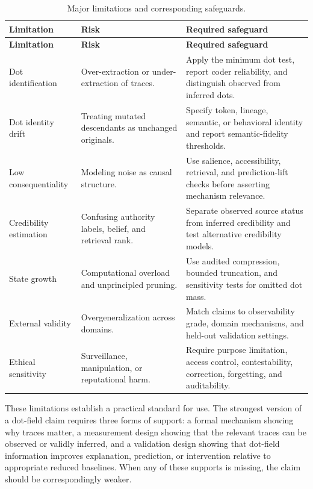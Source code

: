\documentclass[11pt]{article}
\theoremstyle{remark}
\begin{document}
\begin{longtable}{L{0.20\textwidth}L{0.31\textwidth}L{0.37\textwidth}}
\caption{Major limitations and corresponding safeguards.}\label{tab:limitations-safeguards}\\
\toprule
\textbf{Limitation} & \textbf{Risk} & \textbf{Required safeguard}\\
\midrule
\endfirsthead
\toprule
\textbf{Limitation} & \textbf{Risk} & \textbf{Required safeguard}\\
\midrule
\endhead
Dot identification & Over-extraction or under-extraction of traces. & Apply the minimum dot test, report coder reliability, and distinguish observed from inferred dots.\\
Dot identity drift & Treating mutated descendants as unchanged originals. & Specify token, lineage, semantic, or behavioral identity and report semantic-fidelity thresholds.\\
Low consequentiality & Modeling noise as causal structure. & Use salience, accessibility, retrieval, and prediction-lift checks before asserting mechanism relevance.\\
Credibility estimation & Confusing authority labels, belief, and retrieval rank. & Separate observed source status from inferred credibility and test alternative credibility models.\\
State growth & Computational overload and unprincipled pruning. & Use audited compression, bounded truncation, and sensitivity tests for omitted dot mass.\\
External validity & Overgeneralization across domains. & Match claims to observability grade, domain mechanisms, and held-out validation settings.\\
Ethical sensitivity & Surveillance, manipulation, or reputational harm. & Require purpose limitation, access control, contestability, correction, forgetting, and auditability.\\
\bottomrule
\end{longtable}

These limitations establish a practical standard for use. The strongest version of a dot-field claim requires three forms of support: a formal mechanism showing why traces matter, a measurement design showing that the relevant traces can be observed or validly inferred, and a validation design showing that dot-field information improves explanation, prediction, or intervention relative to appropriate reduced baselines. When any of these supports is missing, the claim should be correspondingly weaker.
\end{document}

